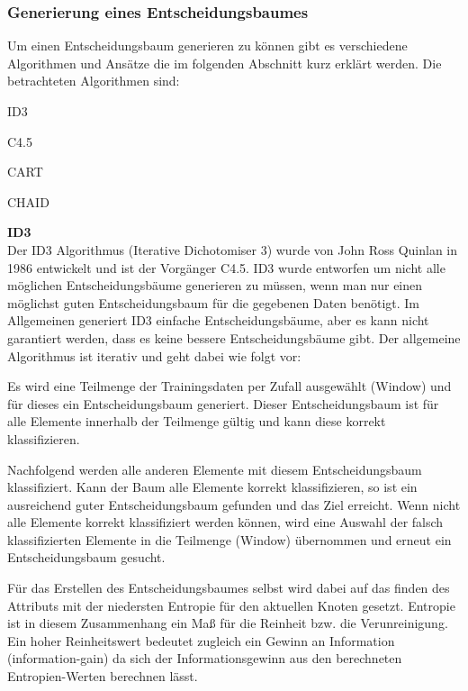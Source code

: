\subsubsection{Generierung eines Entscheidungsbaumes}
\label{entscheidungsbaumAlgorithmen}
Um einen Entscheidungsbaum generieren zu können gibt es verschiedene Algorithmen und Ansätze die im folgenden Abschnitt kurz erklärt werden. Die betrachteten Algorithmen sind:
\begin{pitemize}
\item ID3
\item C4.5
\item CART
\item CHAID
\end{pitemize}

\textbf{ID3} \\
Der ID3 Algorithmus (Iterative Dichotomiser 3) wurde von John Ross Quinlan in 1986 entwickelt und ist der Vorgänger C4.5. ID3 wurde entworfen um nicht alle möglichen Entscheidungsbäume generieren zu müssen, wenn man nur einen möglichst guten Entscheidungsbaum für die gegebenen Daten benötigt. Im Allgemeinen generiert ID3 einfache Entscheidungsbäume, aber es kann nicht garantiert werden, dass es keine bessere Entscheidungsbäume gibt. Der allgemeine Algorithmus ist iterativ und geht dabei wie folgt vor: \cite{john_ross_quinlan_1986}

\begin{pitemize}
\item Es wird eine Teilmenge der Trainingsdaten per Zufall ausgewählt (Window) und für dieses ein Entscheidungsbaum generiert. Dieser Entscheidungsbaum ist für alle Elemente innerhalb der Teilmenge gültig und kann diese korrekt klassifizieren. 
\item Nachfolgend werden alle anderen Elemente mit diesem Entscheidungsbaum klassifiziert. Kann der Baum alle Elemente korrekt klassifizieren, so ist ein ausreichend guter Entscheidungsbaum gefunden und das Ziel erreicht. Wenn nicht alle Elemente korrekt klassifiziert werden können, wird eine Auswahl der falsch klassifizierten Elemente in die Teilmenge (Window) übernommen und erneut ein Entscheidungsbaum gesucht. 
\end{pitemize}

Für das Erstellen des Entscheidungsbaumes selbst wird dabei auf das finden des Attributs mit der niedersten Entropie für den aktuellen Knoten gesetzt. Entropie ist in diesem Zusammenhang ein Maß für die Reinheit bzw. die Verunreinigung. \cite{howard_hamilton_machine_2009} Ein hoher Reinheitswert bedeutet zugleich ein Gewinn an Information (information-gain) da sich der Informationsgewinn aus den berechneten Entropien-Werten berechnen lässt. \cite{thomas_mitchell_which_1997}

